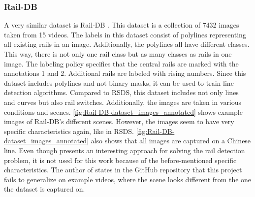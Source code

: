 \subsubsection{Rail-DB}
A very similar dataset is Rail-DB \cite{li2022rail}.
This dataset is a collection of 7432 images taken from 15 videos.
The labels in this dataset consist of polylines representing all existing rails in an image.
Additionally, the polylines all have different classes. This way, there is not only one rail class but as many classes as rails in one image.
The labeling policy specifies that the central rails are marked with the annotations 1 and 2.
Additional rails are labeled with rising numbers.
Since this dataset includes polylines and not binary masks, it can be used to train line detection algorithms.
Compared to \ac{RSDS}, this dataset includes not only lines and curves but also rail switches.
Additionally, the images are taken in various conditions and scenes.
\autoref{fig:Rail-DB-dataset_images_annotated} shows example images of Rail-DB's different scenes.
However, the images seem to have very specific characteristics again, like in \ac{RSDS}.
\autoref{fig:Rail-DB-dataset_images_annotated} also shows that all images are captured on a Chinese line.
Even though \cite{li2022rail} presents an interesting approach for solving the rail detection problem,
it is not used for this work because of the before-mentioned specific characteristics. The author of \cite{li2022rail} states in the GitHub repository \cite{railNet2022GitHub}
that this project fails to generalize on example videos, where the scene looks different from the one the dataset is captured on.

